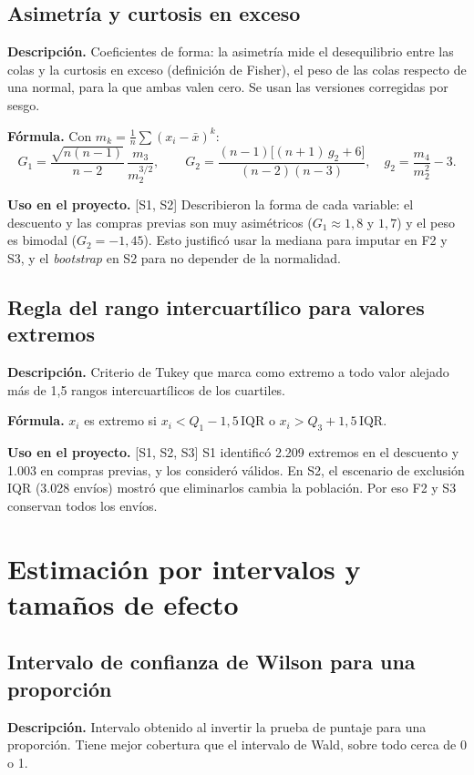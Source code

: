 \documentclass[11pt,a4paper]{article}
\newcommand{\desc}{\textbf{Descripción.} }
\newcommand{\formula}{\textbf{Fórmula.} }
\newcommand{\uso}{\textbf{Uso en el proyecto.} }
\newcommand{\fase}[1]{{\footnotesize\color{gris}[#1]}}
\begin{document}
\subsection{Asimetría y curtosis en exceso}
\desc Coeficientes de forma: la asimetría mide el desequilibrio entre las colas y la curtosis en exceso (definición de Fisher), el peso de las colas respecto de una normal, para la que ambas valen cero. Se usan las versiones corregidas por sesgo.

\formula Con $m_k=\frac1n\sum(x_i-\bar x)^k$:
\[
G_1=\frac{\sqrt{n(n-1)}}{n-2}\,\frac{m_3}{m_2^{3/2}},\qquad
G_2=\frac{(n-1)\big[(n+1)\,g_2+6\big]}{(n-2)(n-3)},\quad g_2=\frac{m_4}{m_2^2}-3 .
\]

\uso \fase{S1, S2} Describieron la forma de cada variable: el descuento y las compras previas son muy asimétricos ($G_1\approx1{,}8$ y $1{,}7$) y el peso es bimodal ($G_2=-1{,}45$). Esto justificó usar la mediana para imputar en F2 y S3, y el \emph{bootstrap} en S2 para no depender de la normalidad.

\subsection{Regla del rango intercuartílico para valores extremos}
\desc Criterio de Tukey que marca como extremo a todo valor alejado más de 1,5 rangos intercuartílicos de los cuartiles.

\formula $x_i$ es extremo si $x_i<Q_1-1{,}5\,\mathrm{IQR}$ o $x_i>Q_3+1{,}5\,\mathrm{IQR}$.

\uso \fase{S1, S2, S3} S1 identificó 2.209 extremos en el descuento y 1.003 en compras previas, y los consideró válidos. En S2, el escenario de exclusión IQR (3.028 envíos) mostró que eliminarlos cambia la población. Por eso F2 y S3 conservan todos los envíos.

\section{Estimación por intervalos y tamaños de efecto}\label{sec:estimacion}

\subsection{Intervalo de confianza de Wilson para una proporción}
\desc Intervalo obtenido al invertir la prueba de puntaje para una proporción. Tiene mejor cobertura que el intervalo de Wald, sobre todo cerca de 0 o 1.
\end{document}
